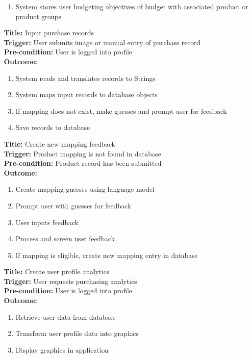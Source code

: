 \documentclass[12pt]{article}
\begin{document}
\begin{enumerate}
    \item System stores user budgeting objectives of budget with associated product or product groups
\end{enumerate}
\textbf{Title:} Input purchase records \\
\textbf{Trigger:} User submits image or manual entry of purchase record \\
\textbf{Pre-condition:} User is logged into profile \\
\textbf{Outcome: } 
\begin{enumerate}
    \item System reads and translates records to Strings
    \item System maps input records to database objects
    \item If mapping does not exist, make guesses and prompt user for feedback
    \item Save records to database
\end{enumerate}
\textbf{Title:} Create new mapping feedback \\
\textbf{Trigger:} Product mapping is not found in database \\
\textbf{Pre-condition:} Product record has been submitted \\
\textbf{Outcome: } 
\begin{enumerate}
    \item Create mapping guesses using language model
    \item Prompt user with guesses for feedback
    \item User inputs feedback
    \item Process and screen user feedback
    \item If mapping is eligible, create new mapping entry in database
\end{enumerate}
\textbf{Title:} Create user profile analytics \\
\textbf{Trigger:} User requests purchasing analytics \\
\textbf{Pre-condition:} User is logged into profile \\
\textbf{Outcome: } 
\begin{enumerate}
    \item Retrieve user data from database
    \item Transform user profile data into graphics
    \item Display graphics in application
\end{enumerate}
\end{document}
